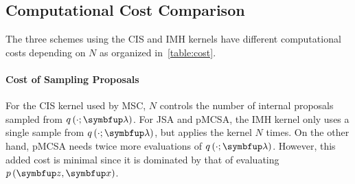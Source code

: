 
\begin{table*}[t]
  \vspace{-2ex}
  \centering
  
  \vspace{-3ex}
\end{table*}
%
\vspace{-1.5ex}
\subsection{Computational Cost Comparison}
\vspace{-1.5ex}
The three schemes using the CIS and IMH kernels have different computational costs depending on \(N\) as organized in~\cref{table:cost}.

\vspace{-1.5ex}
\paragraph{Cost of Sampling Proposals}
For the CIS kernel used by MSC, \(N\) controls the number of internal proposals sampled from \(q\,(\cdot; \vlambda)\).
For JSA and pMCSA, the IMH kernel only uses a single sample from \(q\,(\cdot; \vlambda)\), but applies the kernel \(N\) times.
On the other hand, pMCSA needs twice more evaluations of \(q\,(\cdot; \vlambda)\).
However, this added cost is minimal since it is dominated by that of evaluating \(p\,(\vz,\vx)\).

